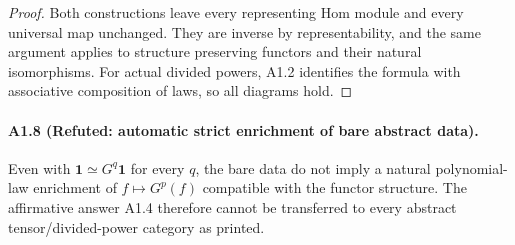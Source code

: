 \begin{proof}
Both constructions leave every representing Hom module and every
universal map unchanged. They are inverse by representability, and
the same argument applies to structure preserving functors and their
natural isomorphisms. For actual divided powers, A1.2 identifies the
formula with associative composition of laws, so all diagrams hold.
\end{proof}

\paragraph{A1.8 (Refuted: automatic strict enrichment of bare abstract data).}
Even with $\mathbf1\simeq G^q\mathbf1$ for every $q$, the bare data
do not imply a natural polynomial-law enrichment of
$f\mapsto G^p(f)$ compatible with the functor structure. The
affirmative answer A1.4 therefore cannot be transferred to every
abstract tensor/divided-power category as printed.

